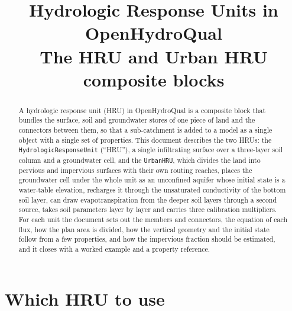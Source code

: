 \documentclass[11pt,a4paper]{article}
\title{\textbf{Hydrologic Response Units in OpenHydroQual}\\[0.3em]
       \large The HRU and Urban HRU composite blocks}
\author{}
\date{}
\newcommand{\code}[1]{\texttt{\small #1}}
\renewcommand{\_}{\oldus\allowbreak}   %
\begin{document}
\maketitle
\vspace{-2.5em}

\begin{abstract}
\noindent
A hydrologic response unit (HRU) in OpenHydroQual is a composite block that bundles the surface,
soil and groundwater stores of one piece of land and the connectors between them, so that a
sub-catchment is added to a model as a single object with a single set of properties. This document
describes the two HRUs: the \code{Hydrologic\_Response\_Unit} (``HRU''), a single infiltrating surface
over a three-layer soil column and a groundwater cell, and the \code{Urban\_HRU}, which divides the
land into pervious and impervious surfaces with their own routing reaches, places the groundwater cell
under the whole unit as an unconfined aquifer whose initial state is a water-table elevation,
recharges it through the unsaturated conductivity of the bottom soil layer, can draw
evapotranspiration from the deeper soil layers through a second source, takes soil parameters layer
by layer and carries three calibration multipliers. For each unit the document sets out the members and connectors, the equation of each
flux, how the plan area is divided, how the vertical geometry and the initial state follow from a
few properties, and how the impervious fraction should be estimated, and it closes with a worked
example and a property reference.
\end{abstract}

\tableofcontents

\section{Which HRU to use}
\end{document}
